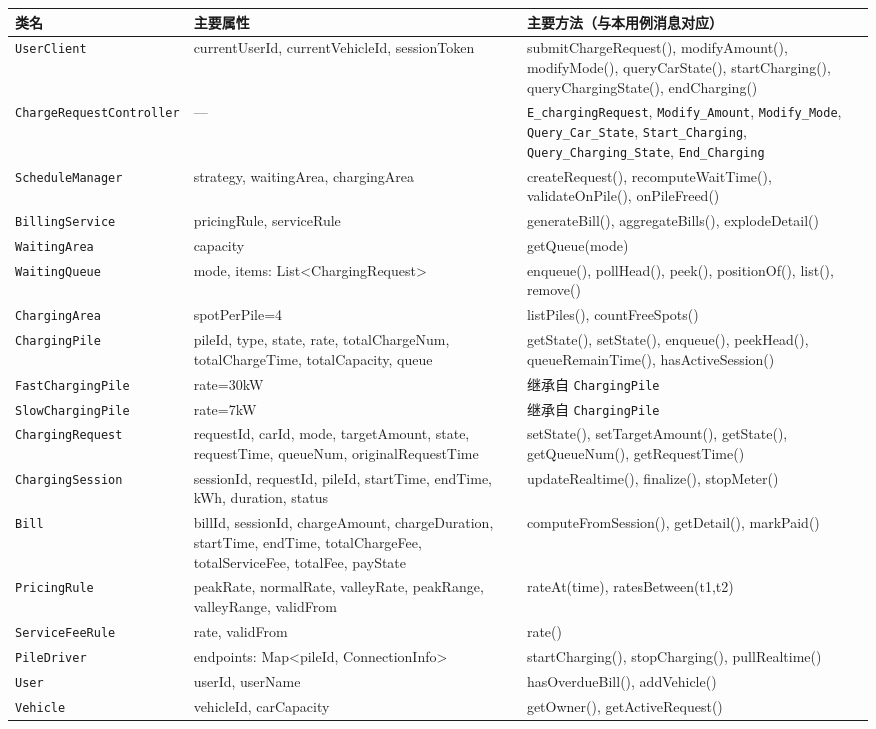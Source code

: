 \documentclass[a4paper,11pt]{ctexart}
\begin{document}
\begin{longtable}{p{3.6cm}p{5.4cm}p{6.5cm}}
\toprule
\textbf{类名} & \textbf{主要属性} & \textbf{主要方法（与本用例消息对应）} \\
\midrule
\endhead
\texttt{UserClient} & currentUserId, currentVehicleId, sessionToken & submitChargeRequest(), modifyAmount(), modifyMode(), queryCarState(), startCharging(), queryChargingState(), endCharging() \\
\texttt{ChargeRequestController} & — & \texttt{E\_chargingRequest}, \texttt{Modify\_Amount}, \texttt{Modify\_Mode}, \texttt{Query\_Car\_State}, \texttt{Start\_Charging}, \texttt{Query\_Charging\_State}, \texttt{End\_Charging} \\
\texttt{ScheduleManager} & strategy, waitingArea, chargingArea & createRequest(), recomputeWaitTime(), validateOnPile(), onPileFreed() \\
\texttt{BillingService} & pricingRule, serviceRule & generateBill(), aggregateBills(), explodeDetail() \\
\texttt{WaitingArea} & capacity & getQueue(mode) \\
\texttt{WaitingQueue} & mode, items: List\textless ChargingRequest\textgreater & enqueue(), pollHead(), peek(), positionOf(), list(), remove() \\
\texttt{ChargingArea} & spotPerPile=4 & listPiles(), countFreeSpots() \\
\texttt{ChargingPile} & pileId, type, state, rate, totalChargeNum, totalChargeTime, totalCapacity, queue & getState(), setState(), enqueue(), peekHead(), queueRemainTime(), hasActiveSession() \\
\texttt{FastChargingPile} & rate=30kW & 继承自 \texttt{ChargingPile} \\
\texttt{SlowChargingPile} & rate=7kW & 继承自 \texttt{ChargingPile} \\
\texttt{ChargingRequest} & requestId, carId, mode, targetAmount, state, requestTime, queueNum, originalRequestTime & setState(), setTargetAmount(), getState(), getQueueNum(), getRequestTime() \\
\texttt{ChargingSession} & sessionId, requestId, pileId, startTime, endTime, kWh, duration, status & updateRealtime(), finalize(), stopMeter() \\
\texttt{Bill} & billId, sessionId, chargeAmount, chargeDuration, startTime, endTime, totalChargeFee, totalServiceFee, totalFee, payState & computeFromSession(), getDetail(), markPaid() \\
\texttt{PricingRule} & peakRate, normalRate, valleyRate, peakRange, valleyRange, validFrom & rateAt(time), ratesBetween(t1,t2) \\
\texttt{ServiceFeeRule} & rate, validFrom & rate() \\
\texttt{PileDriver} & endpoints: Map\textless pileId, ConnectionInfo\textgreater & startCharging(), stopCharging(), pullRealtime() \\
\texttt{User} & userId, userName & hasOverdueBill(), addVehicle() \\
\texttt{Vehicle} & vehicleId, carCapacity & getOwner(), getActiveRequest() \\
\bottomrule
\end{longtable}
\end{document}
